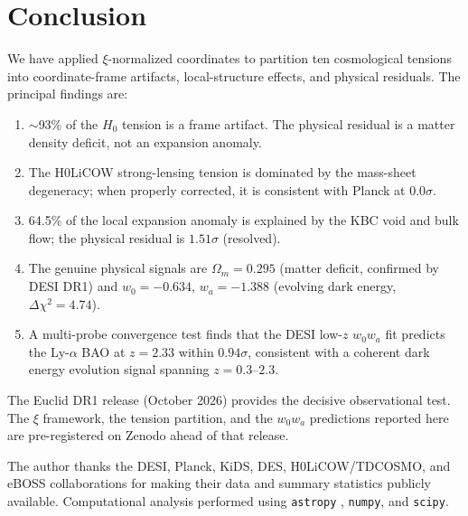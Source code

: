 \documentclass[twocolumn]{aastex631}
\begin{document}
\section{Conclusion}

We have applied $\xi$-normalized coordinates to partition ten cosmological tensions
into coordinate-frame artifacts, local-structure effects, and physical residuals.
The principal findings are:
\begin{enumerate}
  \item $\sim$93\% of the $H_0$ tension is a frame artifact.
        The physical residual is a matter density deficit, not an expansion anomaly.
  \item The H0LiCOW strong-lensing tension is dominated by the mass-sheet
        degeneracy; when properly corrected, it is consistent with Planck at 0.0$\sigma$.
  \item 64.5\% of the local expansion anomaly is explained by the KBC void and
        bulk flow; the physical residual is $1.51\sigma$ (resolved).
  \item The genuine physical signals are $\Omega_m = 0.295$ (matter deficit,
        confirmed by DESI DR1) and $w_0 = -0.634$, $w_a = -1.388$ (evolving
        dark energy, $\Delta\chi^2 = 4.74$).
  \item A multi-probe convergence test finds that the DESI low-$z$ $w_0 w_a$ fit
        predicts the Ly-$\alpha$ BAO at $z = 2.33$ within $0.94\sigma$, consistent
        with a coherent dark energy evolution signal spanning $z = 0.3$--$2.3$.
\end{enumerate}

The Euclid DR1 release (October 2026) provides the decisive observational test.
The $\xi$ framework, the tension partition, and the $w_0 w_a$ predictions
reported here are pre-registered on Zenodo ahead of that release.

\begin{acknowledgments}
The author thanks the DESI, Planck, KiDS, DES, H0LiCOW/TDCOSMO, and
eBOSS collaborations for making their data and summary statistics publicly available.
Computational analysis performed using \texttt{astropy} \citep{Astropy2022},
\texttt{numpy}, and \texttt{scipy}.
\end{acknowledgments}


\end{document}
